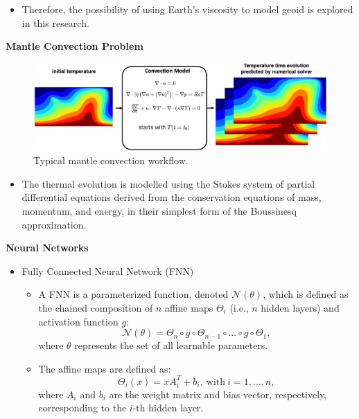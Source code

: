 {\begin{itemize}
     \item Therefore, the possibility of using Earth's viscosity to model geoid is explored in this research.
\end{itemize}

\textbf{Mantle Convection Problem}

\begin{figure}[H]
    \includegraphics[width=\linewidth]{figures/Mantle_Convection_workflow.png}
    \caption{Typical mantle convection workflow.}
\end{figure}

\begin{itemize}
    \item The thermal evolution is modelled using the Stokes system of partial differential equations derived from the conservation equations of mass, momentum, and energy, in their simplest form of the Boussinesq approximation. 
\end{itemize}

\textbf{Neural Networks}
\begin{itemize}
    \item Fully Connected Neural Network (FNN)
            \begin{itemize} 
                \item A FNN is a parameterized function, denoted $\mathcal{N}(\theta)$, which is defined as the chained composition of $n$ affine maps $\Theta_i$ (i.e., $n$ hidden layers) and activation function $g$:
            \begin{equation*}
            \mathcal{N}(\theta) = \Theta_n \circ g \circ \Theta_{n-1} \circ \ldots \circ g \circ \Theta_1,
            \end{equation*}
            where $\theta$ represents the set of all learnable parameters.
               \item The affine maps are defined as:
            \begin{equation*} \Theta_i(x) = xA_i^{T} + b_i, \ \mathrm{with} \ i=1,\ldots,n, \end{equation*}
            where $A_i$ and $b_i$ are the weight matrix and bias vector, respectively, corresponding to the $i$-th hidden layer.
        \end{itemize}


\end{itemize}}
